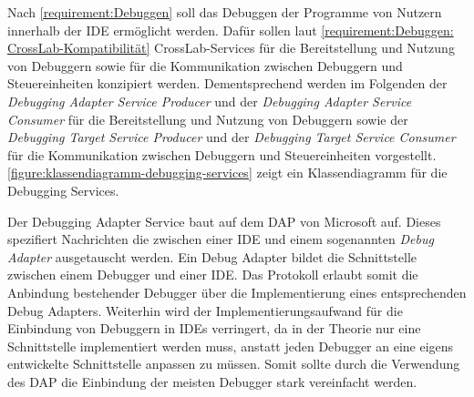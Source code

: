 Nach \autoref{requirement:Debuggen} soll das Debuggen der Programme von Nutzern innerhalb der IDE ermöglicht werden. Dafür sollen laut \autoref{requirement:Debuggen: CrossLab-Kompatibilität} CrossLab-Services für die Bereitstellung und Nutzung von Debuggern sowie für die Kommunikation zwischen Debuggern und Steuereinheiten konzipiert werden. Dementsprechend werden im Folgenden der \textit{Debugging Adapter Service Producer} und der \textit{Debugging Adapter Service Consumer} für die Bereitstellung und Nutzung von Debuggern sowie der \textit{Debugging Target Service Producer} und der \textit{Debugging Target Service Consumer} für die Kommunikation zwischen Debuggern und Steuereinheiten vorgestellt. \autoref{figure:klassendiagramm-debugging-services} zeigt ein Klassendiagramm für die Debugging Services.

Der Debugging Adapter Service baut auf dem \ac{DAP} \cite{noauthor_debug-adapter-protocol_nodate} von Microsoft auf. Dieses spezifiert Nachrichten die zwischen einer IDE und einem sogenannten \textit{Debug Adapter} ausgetauscht werden. Ein Debug Adapter bildet die Schnittstelle zwischen einem Debugger und einer IDE. Das Protokoll erlaubt somit die Anbindung bestehender Debugger über die Implementierung eines entsprechenden Debug Adapters. Weiterhin wird der Implementierungsaufwand für die Einbindung von Debuggern in IDEs verringert, da in der Theorie nur eine Schnittstelle implementiert werden muss, anstatt jeden Debugger an eine eigens entwickelte Schnittstelle anpassen zu müssen. Somit sollte durch die Verwendung des \ac{DAP} die Einbindung der meisten Debugger stark vereinfacht werden.

